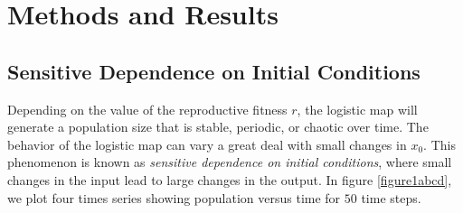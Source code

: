 \documentclass[conference]{IEEEtran}
\begin{document}
%






\section{Methods and Results}

\subsection{Sensitive Dependence on Initial Conditions}
\noindent Depending on the value of the reproductive fitness $r$, the logistic map will generate a population size that is stable, periodic, or chaotic over time.  The behavior of the logistic map can vary a great deal with small changes in $x_0$.  This phenomenon is known as {\it sensitive dependence on initial conditions}, where small changes in the input lead to large changes in the output.  In figure \ref{figure1abcd}, we plot four times series showing population versus time for $50$ time steps.   \\
\end{document}
